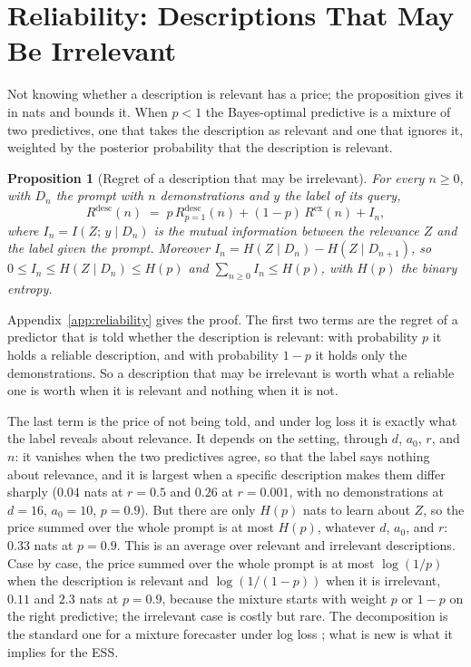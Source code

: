 \documentclass{article}
\newtheorem{proposition}[theorem]{Proposition}
\begin{document}
\section{Reliability: Descriptions That May Be Irrelevant}\label{sec:reliability}
Not knowing whether a description is relevant has a price; the proposition gives it in nats and bounds it. When $p < 1$ the Bayes-optimal predictive is a mixture of two predictives, one that takes the description as relevant and one that ignores it, weighted by the posterior probability that the description is relevant.

\begin{proposition}[Regret of a description that may be irrelevant]\label{prop:unreliable}
For every $n \ge 0$, with $D_n$ the prompt with $n$ demonstrations and $y$ the label of its query,
\begin{equation}\label{eq:decomp}
    R^{\mathrm{desc}}(n) \;=\; p\, R^{\mathrm{desc}}_{p=1}(n) + (1-p)\, R^{\mathrm{ex}}(n) + I_n,
\end{equation}
where $I_n = I(Z;\, y \mid D_n)$ is the mutual information between the relevance $Z$ and the label given the prompt. Moreover $I_n = H(Z \mid D_n) - H(Z \mid D_{n+1})$, so $0 \le I_n \le H(Z \mid D_n) \le H(p)$ and $\sum_{n \ge 0} I_n \le H(p)$, with $H(p)$ the binary entropy.
\end{proposition}
Appendix~\ref{app:reliability} gives the proof. The first two terms are the regret of a predictor that is told whether the description is relevant: with probability $p$ it holds a reliable description, and with probability $1-p$ it holds only the demonstrations. So a description that may be irrelevant is worth what a reliable one is worth when it is relevant and nothing when it is not.

The last term is the price of not being told, and under log loss it is exactly what the label reveals about relevance. It depends on the setting, through $d$, $a_0$, $r$, and $n$: it vanishes when the two predictives agree, so that the label says nothing about relevance, and it is largest when a specific description makes them differ sharply ($0.04$ nats at $r = 0.5$ and $0.26$ at $r = 0.001$, with no demonstrations at $d = 16$, $a_0 = 10$, $p = 0.9$). But there are only $H(p)$ nats to learn about $Z$, so the price summed over the whole prompt is at most $H(p)$, whatever $d$, $a_0$, and $r$: $0.33$ nats at $p = 0.9$. This is an average over relevant and irrelevant descriptions. Case by case, the price summed over the whole prompt is at most $\log(1/p)$ when the description is relevant and $\log(1/(1-p))$ when it is irrelevant, $0.11$ and $2.3$ nats at $p = 0.9$, because the mixture starts with weight $p$ or $1-p$ on the right predictive; the irrelevant case is costly but rare. The decomposition is the standard one for a mixture forecaster under log loss \citep{cesabianchi2006, merhav1998}; what is new is what it implies for the ESS.
\end{document}
